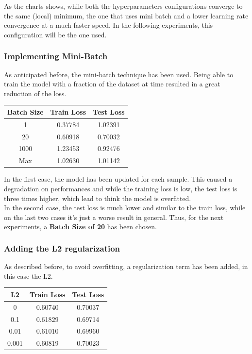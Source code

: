 \documentclass[
	letterpaper, %
	10pt, %
]{class}
\begin{document}
As the charts shows, while both the hyperparameters configurations converge to the same (local) minimum, the one that uses mini batch and a lower learning rate convergence at a much faster speed.
In the following experiments, this configuration will be the one used.

\subsubsection{Implementing Mini-Batch}

As anticipated before, the mini-batch technique has been used. Being able to train the model with a fraction of the dataset at time resulted in a great reduction of the loss.

\begin{center}
    \begin{tabular}{ |c|c|c| }
        \hline
        Batch Size & Train Loss & Test Loss \\
        \hline
        1          & 0.37784    & 1.02391   \\
        20         & 0.60918    & 0.70032   \\
        1000       & 1.23453    & 0.92476   \\
        Max        & 1.02630    & 1.01142   \\
        \hline
    \end{tabular}
\end{center}

In the first case, the model has been updated for each sample. This caused a degradation on performances and while the training loss is low, the test loss is three times higher, which lead to think the model is overfitted.\\

In the second case, the test loss is much lower and similar to the train loss, while on the last two cases it's just a worse result in general. Thus, for the next experiments, a \textbf{Batch Size of 20} has been chosen.

\subsubsection{Adding the L2 regularization}

As described before, to avoid overfitting, a regularization term has been added, in this case the L2.

\begin{center}
    \begin{tabular}{ |c|c|c| }
        \hline
        L2    & Train Loss & Test Loss \\
        \hline
        0     & 0.60740    & 0.70037   \\
        0.1   & 0.61829    & 0.69714   \\
        0.01  & 0.61010    & 0.69960   \\
        0.001 & 0.60819    & 0.70023   \\
        \hline
    \end{tabular}
\end{center}
\end{document}
